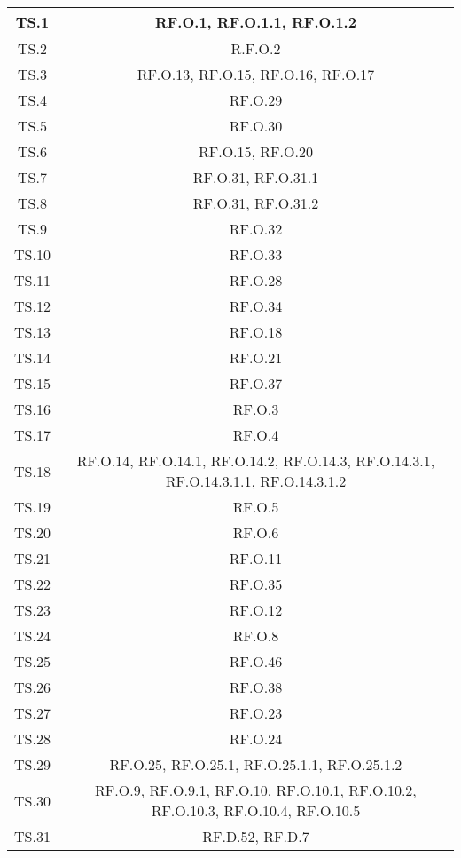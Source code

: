 \begin{adjustwidth}{-0.5cm}{-0.5cm}
\begin{longtable}{|c|c|}
    TS.1 & RF.O.1, RF.O.1.1, RF.O.1.2\\
		\hline TS.2 & R.F.O.2\\
		\hline TS.3 & RF.O.13, RF.O.15, RF.O.16, RF.O.17\\
		\hline TS.4 & RF.O.29\\
		\hline TS.5 & RF.O.30\\
		\hline TS.6 & RF.O.15, RF.O.20\\
		\hline TS.7 & RF.O.31, RF.O.31.1\\
		\hline TS.8 & RF.O.31, RF.O.31.2\\
		\hline TS.9 & RF.O.32\\
		\hline TS.10 & RF.O.33\\
		\hline TS.11 & RF.O.28\\
		\hline TS.12 & RF.O.34\\
		\hline TS.13 & RF.O.18\\
		\hline TS.14 & RF.O.21\\
		\hline TS.15 & RF.O.37\\
		\hline TS.16 & RF.O.3\\
		\hline TS.17 & RF.O.4\\
		\hline TS.18 & RF.O.14, RF.O.14.1, RF.O.14.2, RF.O.14.3, RF.O.14.3.1, RF.O.14.3.1.1, RF.O.14.3.1.2\\
		\hline TS.19 & RF.O.5\\
		\hline TS.20 & RF.O.6\\
		\hline TS.21 & RF.O.11\\
		\hline TS.22 & RF.O.35\\
		\hline TS.23 & RF.O.12\\
		\hline TS.24 & RF.O.8\\
		\hline TS.25 & RF.O.46\\
		\hline TS.26 & RF.O.38\\
		\hline TS.27 & RF.O.23\\
		\hline TS.28 & RF.O.24\\
		\hline TS.29 & RF.O.25, RF.O.25.1, RF.O.25.1.1, RF.O.25.1.2\\
		\hline TS.30 & RF.O.9, RF.O.9.1, RF.O.10, RF.O.10.1, RF.O.10.2, RF.O.10.3, RF.O.10.4, RF.O.10.5\\
		\hline TS.31 & RF.D.52, RF.D.7\\
  \end{longtable}
\end{adjustwidth}
\egroup